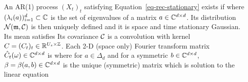 \begin{proposition}\label{prop-ar-processes}
	An AR(1) process $(X_t)_t$ satisfying Equation~\eqref{eq-rec-stationary} exists if
	where $(\lambda_i(a))_{i=1}^d \subset \mathbb{C}$ is the set of eigenvalues of a matrix $a \in \mathbb{C}^{d \times d}$.
	Its distribution $\mathcal{N}({\frak m},\mathcal{C})$ is then uniquely defined and it is space and time stationary Gaussian.
	Its mean satisfies
	Its covariance $\mathcal{C}$ is a convolution with kernel
$C = (C_t)_t \in \mathbb{R}^{U_s \times \mathbb{Z}}$. Each 2-D (space only) Fourier transform matrix $\hat {C}_t(\omega) \in \mathbb{C}^{d \times d}$ is
	where for $a \in \Delta_d$ and for a symmetric $b \in \mathbb{C}^{d \times d}$, $\beta = \beta(a,b) \in \mathbb{C}^{d \times d}$ is the unique (symmetric) matrix which is solution to the linear equation
\end{proposition}

